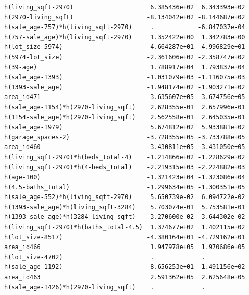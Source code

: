 \documentclass[
]{article}
\begin{document}
\begin{verbatim}
h(living_sqft-2970)                     6.385436e+02  6.343393e+02
h(2970-living_sqft)                    -8.134042e+02 -8.144687e+02
h(sale_age-757)*h(living_sqft-2970)     .            -6.847037e-04
h(757-sale_age)*h(living_sqft-2970)     1.352422e+00  1.342783e+00
h(lot_size-5974)                        4.664287e+01  4.996829e+01
h(5974-lot_size)                       -2.361606e+02 -2.358747e+02
h(39-age)                               1.788917e+04  1.793837e+04
h(sale_age-1393)                       -1.031079e+03 -1.116075e+03
h(1393-sale_age)                       -1.948174e+02 -1.903271e+02
area_id471                             -3.635607e+05 -3.674756e+05
h(sale_age-1154)*h(2970-living_sqft)    2.628355e-01  2.657996e-01
h(1154-sale_age)*h(2970-living_sqft)    2.562558e-01  2.645035e-01
h(sale_age-1979)                        5.674812e+02  5.933881e+02
h(garage_spaces-2)                     -3.728355e+05 -3.733788e+05
area_id460                              3.430811e+05  3.431050e+05
h(living_sqft-2970)*h(beds_total-4)    -1.214866e+02 -1.228629e+02
h(living_sqft-2970)*h(4-beds_total)    -2.219315e+03 -2.224882e+03
h(age-100)                             -1.321423e+04 -1.323086e+04
h(4.5-baths_total)                     -1.299634e+05 -1.300351e+05
h(sale_age-552)*h(living_sqft-2970)     5.650739e-02  6.094722e-02
h(1393-sale_age)*h(living_sqft-3284)    5.703074e-01  5.753581e-01
h(1393-sale_age)*h(3284-living_sqft)   -3.270600e-02 -3.644302e-02
h(living_sqft-2970)*h(baths_total-4.5)  1.374677e+02  1.402115e+02
h(lot_size-8517)                       -4.380164e+01 -4.729162e+01
area_id466                              1.947978e+05  1.970686e+05
h(lot_size-4702)                        .             .           
h(sale_age-1192)                        8.656253e+01  1.491156e+02
area_id463                              2.591362e+05  2.625648e+05
h(sale_age-1426)*h(2970-living_sqft)    .             .           
                                                                  

\end{verbatim}
\end{document}
